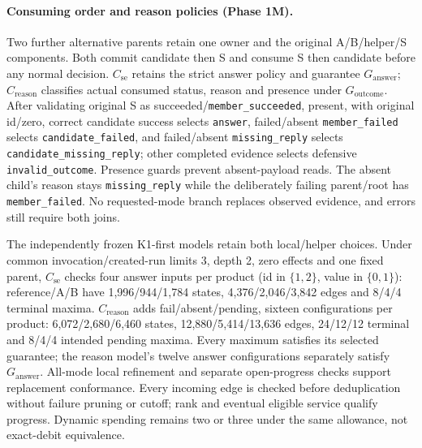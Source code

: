 \documentclass[11pt,a4paper]{article}
\theoremstyle{definition}
\theoremstyle{remark}
\begin{document}
\paragraph{Consuming order and reason policies (Phase 1M).} Two further alternative parents retain one owner and the original A/B/helper/S components. Both commit candidate then S and consume S then candidate before any normal decision. $C_{\mathrm{se}}$ retains the strict answer policy and guarantee $G_{\mathrm{answer}}$; $C_{\mathrm{reason}}$ classifies actual consumed status, reason and presence under $G_{\mathrm{outcome}}$. After validating original S as succeeded/\texttt{member\_succeeded}, present, with original id/zero, correct candidate success selects \texttt{answer}, failed/absent \texttt{member\_failed} selects \texttt{candidate\_failed}, and failed/absent \texttt{missing\_reply} selects \texttt{candidate\_missing\_reply}; other completed evidence selects defensive \texttt{invalid\_outcome}. Presence guards prevent absent-payload reads. The absent child's reason stays \texttt{missing\_reply} while the deliberately failing parent/root has \texttt{member\_failed}. No requested-mode branch replaces observed evidence, and errors still require both joins.

The independently frozen K1-first models retain both local/helper choices. Under common invocation/created-run limits 3, depth 2, zero effects and one fixed parent, $C_{\mathrm{se}}$ checks four answer inputs per product (id in $\{1,2\}$, value in $\{0,1\}$): reference/A/B have 1,996/944/1,784 states, 4,376/2,046/3,842 edges and 8/4/4 terminal maxima. $C_{\mathrm{reason}}$ adds fail/absent/pending, sixteen configurations per product: 6,072/2,680/6,460 states, 12,880/5,414/13,636 edges, 24/12/12 terminal and 8/4/4 intended pending maxima. Every maximum satisfies its selected guarantee; the reason model's twelve answer configurations separately satisfy $G_{\mathrm{answer}}$. All-mode local refinement and separate open-progress checks support replacement conformance. Every incoming edge is checked before deduplication without failure pruning or cutoff; rank and eventual eligible service qualify progress. Dynamic spending remains two or three under the same allowance, not exact-debit equivalence.
\end{document}
